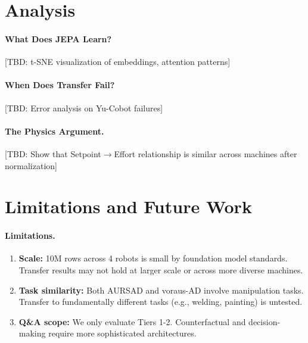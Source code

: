\documentclass{article}
\begin{document}
\section{Analysis}

\paragraph{What Does JEPA Learn?} [TBD: t-SNE visualization of embeddings, attention patterns]

\paragraph{When Does Transfer Fail?} [TBD: Error analysis on Yu-Cobot failures]

\paragraph{The Physics Argument.} [TBD: Show that Setpoint$\rightarrow$Effort relationship is similar across machines after normalization]

\section{Limitations and Future Work}

\paragraph{Limitations.}
\begin{enumerate}
    \item \textbf{Scale:} 10M rows across 4 robots is small by foundation model standards. Transfer results may not hold at larger scale or across more diverse machines.
    \item \textbf{Task similarity:} Both AURSAD and voraus-AD involve manipulation tasks. Transfer to fundamentally different tasks (e.g., welding, painting) is untested.
    \item \textbf{Q\&A scope:} We only evaluate Tiers 1-2. Counterfactual and decision-making require more sophisticated architectures.
\end{enumerate}
\end{document}
